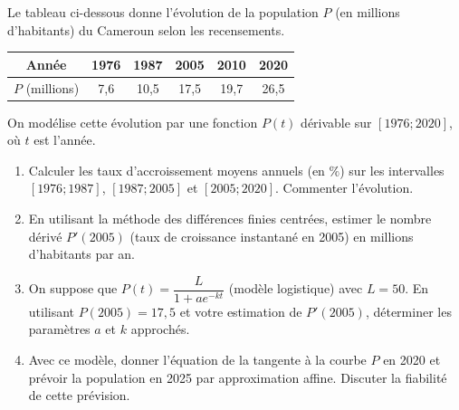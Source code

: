 \documentclass[11pt]{article}
\begin{document}
\begin{exercice}
Le tableau ci-dessous donne l'évolution de la population $P$ (en millions d'habitants) du Cameroun selon les recensements.

\begin{center}
\begin{tabular}{|c|c|c|c|c|c|}
\hline
Année & 1976 & 1987 & 2005 & 2010 & 2020 \\ \hline
$P$ (millions) & 7,6 & 10,5 & 17,5 & 19,7 & 26,5 \\ \hline
\end{tabular}
\end{center}
On modélise cette évolution par une fonction $P(t)$ dérivable sur $[1976; 2020]$, où $t$ est l'année.
\begin{enumerate}
    \item Calculer les taux d'accroissement moyens annuels (en $\%$) sur les intervalles $[1976; 1987]$, $[1987; 2005]$ et $[2005; 2020]$. Commenter l'évolution.
    \item En utilisant la méthode des différences finies centrées, estimer le nombre dérivé $P'(2005)$ (taux de croissance instantané en 2005) en millions d'habitants par an.
    \item On suppose que $P(t) = \dfrac{L}{1 + ae^{-kt}}$ (modèle logistique) avec $L=50$. En utilisant $P(2005)=17,5$ et votre estimation de $P'(2005)$, déterminer les paramètres $a$ et $k$ approchés.
    \item Avec ce modèle, donner l'équation de la tangente à la courbe $P$ en 2020 et prévoir la population en 2025 par approximation affine. Discuter la fiabilité de cette prévision.
\end{enumerate}
\end{exercice}
\end{document}
